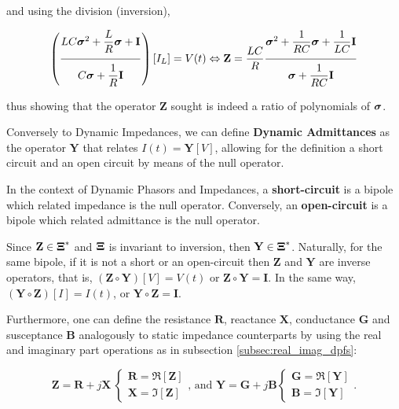 \begin{example}
	\noindent and using the division (inversion),

\begin{equation} \left(\xfrac{3mm}{3mm} {LC\ndpo{2} + \dfrac{L}{R} \dpo + \mathbf{I}}{ C\dpo  + \dfrac{1}{R}\mathbf{I} }\right)\left[I_L\right] = V(t) \Leftrightarrow \mathbf{Z} = \dfrac{LC}{R} \xfrac{3mm}{3mm} {\ndpo{2} + \dfrac{1}{RC} \dpo + \dfrac{1}{LC}\mathbf{I}}{ \dpo  + \dfrac{1}{RC}\mathbf{I} } \label{eq:example_analysis_z}\end{equation}

	\noindent thus showing that the operator $\mathbf{Z}$ sought is indeed a ratio of polynomials of $\boldsymbol{\sigma}$.

\examplebar
\end{example} %

	Conversely to Dynamic Impedances, we can define \textbf{Dynamic Admittances} as the operator $\mathbf{Y}$ that relates $I(t) = \mathbf{Y} \left[V\right]$, allowing for the definition a short circuit and an open circuit by means of the null operator.

\begin{definition}\label{def:short_opencircuit} In the context of Dynamic Phasors and Impedances, a \textbf{short-circuit} is a bipole which related impedance is the null operator. Conversely, an \textbf{open-circuit} is a bipole which related admittance is the null operator.\end{definition}

	Since $\mathbf{Z}\in\boldsymbol{\Xi}^*$ and $\boldsymbol{\Xi}$ is invariant to inversion, then $\mathbf{Y}\in\boldsymbol{\Xi}^*$. Naturally, for the same bipole, if it is not a short or an open-circuit then $\mathbf{Z}$ and $\mathbf{Y}$ are inverse operators, that is, $\left(\mathbf{Z}\circ \mathbf{Y}\right)\left[V\right] = V(t)$ or $\mathbf{Z}\circ\mathbf{Y} = \mathbf{I}$. In the same way, $\left(\mathbf{Y}\circ \mathbf{Z}\right)\left[I\right] = I(t)$, or $\mathbf{Y}\circ\mathbf{Z} = \mathbf{I}$.

	Furthermore, one can define the resistance $\mathbf{R}$, reactance $\mathbf{X}$, conductance $\mathbf{G}$ and susceptance $\mathbf{B}$ analogously to static impedance counterparts by using the real and imaginary part operations as in subsection \ref{subsec:real_imag_dpfs}:

\begin{equation} \mathbf{Z} = \mathbf{R} + j\mathbf{X}\ \left\{\begin{array}{l} \mathbf{R} = \Re\left[\mathbf{Z}\right] \\ \mathbf{X} = \Im\left[\mathbf{Z}\right]\end{array}\right.  \text{, and } \mathbf{Y} = \mathbf{G} + j\mathbf{B}\left\{\begin{array}{l} \mathbf{G} = \Re\left[\mathbf{Y}\right] \\ \mathbf{B} = \Im\left[\mathbf{Y}\right]\end{array}\right. . \end{equation}

